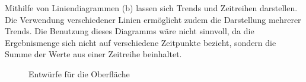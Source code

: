 Mithilfe von Liniendiagrammen (b) lassen sich Trends und Zeitreihen darstellen. Die Verwendung verschiedener Linien ermöglicht zudem die Darstellung mehrerer Trends. Die Benutzung dieses Diagramms wäre nicht sinnvoll, da die Ergebnismenge sich nicht auf verschiedene Zeitpunkte bezieht, sondern die Summe der Werte aus einer Zeitreihe beinhaltet. 

\begin{figure}[htbp]
\hfill
{}\hfill
{}\hfill
{}
\caption{Entwürfe für die Oberfläche}
\label{konzept_darstellung2}
\end{figure}

